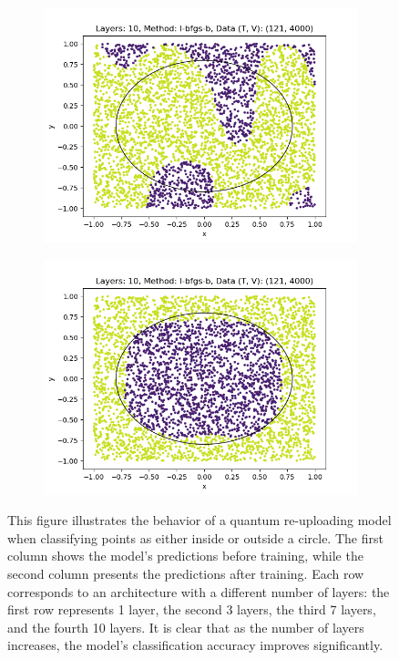 \begin{figure}[h]
\begin{subfigure}[b]{0.45\textwidth}
        \includegraphics[width=\textwidth]{sections/chapters/Quantum-Machine-Learning/Images/Data-Re-Uploading/Layer10-B.png}
    \end{subfigure}
    \begin{subfigure}[b]{0.45\textwidth}
        \centering
        \includegraphics[width=\textwidth]{sections/chapters/Quantum-Machine-Learning/Images/Data-Re-Uploading/Layer10-A.png}
    \end{subfigure}
    \caption{This figure illustrates the behavior of a quantum re-uploading model when classifying points 
    as either inside or outside a circle. The first column shows the model's predictions before training, 
    while the second column presents the predictions after training. Each row corresponds to an architecture 
    with a different number of layers: the first row represents 1 layer, the second 3 layers, the third 7 
    layers, and the fourth 10 layers. It is clear that as the number of layers increases, the model's 
    classification accuracy improves significantly.}
    \label{fig:reuploading-exp}
\end{figure}



